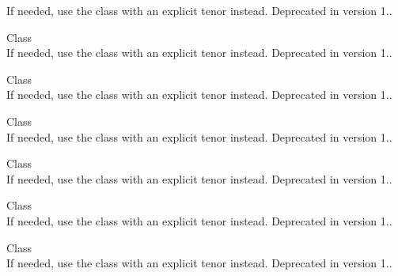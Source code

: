 \begin{DoxyRefList}
\label{deprecated__deprecated000084}%
%
If needed, use the  class with an explicit tenor instead. Deprecated in version 1..  
\item[Class \doxylink{class_quant_lib_1_1_e_u_r_libor11_m}{Quant\+Lib\+::EURLibor11M} ]\hfill \\
\label{deprecated__deprecated000085}%
%
If needed, use the  class with an explicit tenor instead. Deprecated in version 1..  
\item[Class \doxylink{class_quant_lib_1_1_e_u_r_libor2_m}{Quant\+Lib\+::EURLibor2M} ]\hfill \\
\label{deprecated__deprecated000078}%
%
If needed, use the  class with an explicit tenor instead. Deprecated in version 1..  
\item[Class \doxylink{class_quant_lib_1_1_e_u_r_libor2_w}{Quant\+Lib\+::EURLibor2W} ]\hfill \\
\label{deprecated__deprecated000077}%
%
If needed, use the  class with an explicit tenor instead. Deprecated in version 1..  
\item[Class \doxylink{class_quant_lib_1_1_e_u_r_libor4_m}{Quant\+Lib\+::EURLibor4M} ]\hfill \\
\label{deprecated__deprecated000079}%
%
If needed, use the  class with an explicit tenor instead. Deprecated in version 1..  
\item[Class \doxylink{class_quant_lib_1_1_e_u_r_libor5_m}{Quant\+Lib\+::EURLibor5M} ]\hfill \\
\label{deprecated__deprecated000080}%
%
If needed, use the  class with an explicit tenor instead. Deprecated in version 1..  
\item[Class \doxylink{class_quant_lib_1_1_e_u_r_libor7_m}{Quant\+Lib\+::EURLibor7M} ]\hfill \\
\label{deprecated__deprecated000081}%
%
If needed, use the  class with an explicit tenor instead. Deprecated in version 1..  

\end{DoxyRefList}
